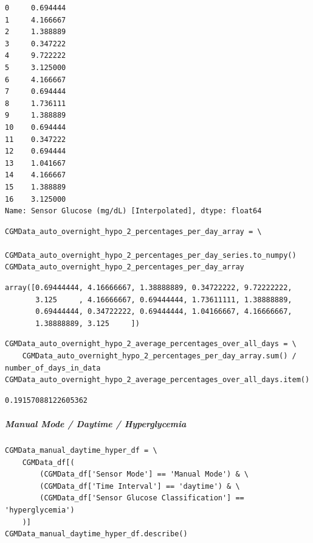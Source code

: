 \begin{verbatim}
0     0.694444
1     4.166667
2     1.388889
3     0.347222
4     9.722222
5     3.125000
6     4.166667
7     0.694444
8     1.736111
9     1.388889
10    0.694444
11    0.347222
12    0.694444
13    1.041667
14    4.166667
15    1.388889
16    3.125000
Name: Sensor Glucose (mg/dL) [Interpolated], dtype: float64
\end{verbatim}

\begin{verbatim}
CGMData_auto_overnight_hypo_2_percentages_per_day_array = \
    CGMData_auto_overnight_hypo_2_percentages_per_day_series.to_numpy()
CGMData_auto_overnight_hypo_2_percentages_per_day_array
\end{verbatim}

\begin{verbatim}
array([0.69444444, 4.16666667, 1.38888889, 0.34722222, 9.72222222,
       3.125     , 4.16666667, 0.69444444, 1.73611111, 1.38888889,
       0.69444444, 0.34722222, 0.69444444, 1.04166667, 4.16666667,
       1.38888889, 3.125     ])
\end{verbatim}

\begin{verbatim}
CGMData_auto_overnight_hypo_2_average_percentages_over_all_days = \
    CGMData_auto_overnight_hypo_2_percentages_per_day_array.sum() / number_of_days_in_data
CGMData_auto_overnight_hypo_2_average_percentages_over_all_days.item()
\end{verbatim}

\begin{verbatim}
0.19157088122605362
\end{verbatim}

\subparagraph{Manual Mode / Daytime / Hyperglycemia}

\begin{verbatim}
CGMData_manual_daytime_hyper_df = \
    CGMData_df[(
        (CGMData_df['Sensor Mode'] == 'Manual Mode') & \
        (CGMData_df['Time Interval'] == 'daytime') & \
        (CGMData_df['Sensor Glucose Classification'] == 'hyperglycemia')
    )]
CGMData_manual_daytime_hyper_df.describe()
\end{verbatim}

